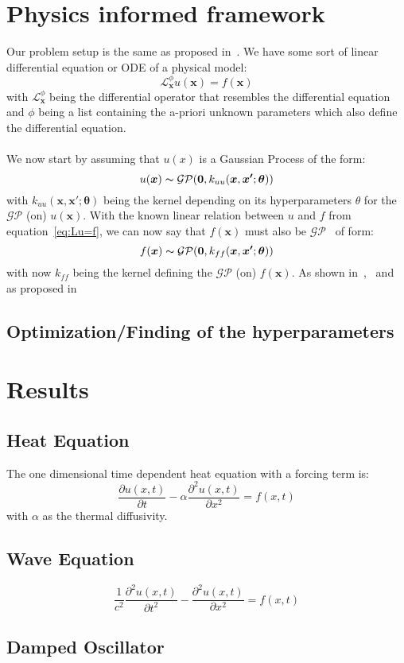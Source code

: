 \documentclass{article}
\begin{document}
\section{Physics informed framework}
Our problem setup is the same as proposed in~\cite{RAISSI}. We have some sort of linear differential equation or ODE of a physical model:
\begin{equation}
    \label{eq:Lu=f}
    \mathcal{L}_{\bm{x}}^\phi u(\bm{x}) = f(\bm{x})
\end{equation}
with $\mathcal{L}_{\bm{x}}^\phi$ being the differential operator that resembles the differential equation and $\phi$ being a list containing the a-priori unknown parameters which also define the differential equation. \\
\\
We now start by assuming that $u(x)$ is a Gaussian Process of the form:
\begin{equation}
    u(\bm{x}) \thicksim \mathcal{G}\mathcal{P}(\bm{0},k_{uu}(\bm{x},\bm{x'};\bm{\theta}))
\end{equation}
with $k_{uu}(\bm{x},\bm{x'};\bm{\theta})$ being the kernel depending on its hyperparameters $\theta$ for the $\mathcal{G}\mathcal{P}$ (on) $u(\bm{x})$. With the known linear relation between $u$ and $f$ from equation~\ref{eq:Lu=f}, we can now say that $f(\bm{x})$ must also be $\mathcal{G}\mathcal{P}$~\cite{RasmussenCarlEdward} of form:
\begin{equation}
    f(\bm{x}) \thicksim \mathcal{G}\mathcal{P}(\bm{0},k_{ff}(\bm{x},\bm{x'};\bm{\theta}))
\end{equation}
with now $k_{ff}$ being the kernel defining the $\mathcal{G}\mathcal{P}$ (on) $f(\bm{x})$. As shown in~\cite{garnett_2023_full},~\cite{Särkkä} and as proposed in~\cite{RAISSI} 
\subsection{Optimization/Finding of the hyperparameters}

\section{Results}
\subsection{Heat Equation}
The one dimensional time dependent heat equation with a forcing term is: 
\begin{equation}
    \frac{\partial u(x,t)}{\partial t} - \alpha \frac{\partial^2 u(x,t)}{\partial x^2} = f(x,t)
\end{equation}
with $\alpha$ as the thermal diffusivity.


\subsection{Wave Equation}
\begin{equation}
    \frac{1}{c^2} \frac{\partial^2 u(x,t)}{\partial t^2} - \frac{\partial^2 u(x,t)}{\partial x^2} = f(x,t)
\end{equation}
\subsection{Damped Oscillator}






\end{document}
